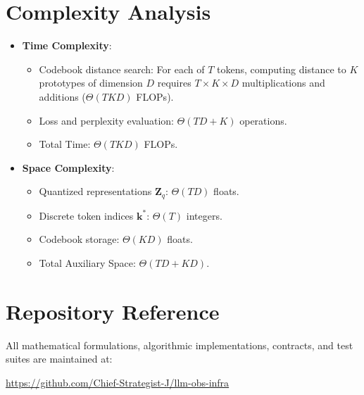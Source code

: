 \documentclass[11pt,a4paper]{article}
\theoremstyle{definition}
\begin{document}
\section{Complexity Analysis}
\begin{itemize}
    \item \textbf{Time Complexity}:
    \begin{itemize}
        \item Codebook distance search: For each of $T$ tokens, computing distance to $K$ prototypes of dimension $D$ requires $T \times K \times D$ multiplications and additions ($\Theta(T K D)$ FLOPs).
        \item Loss and perplexity evaluation: $\Theta(T D + K)$ operations.
        \item Total Time: $\Theta(T K D)$ FLOPs.
    \end{itemize}
    \item \textbf{Space Complexity}:
    \begin{itemize}
        \item Quantized representations $\mathbf{Z}_q$: $\Theta(T D)$ floats.
        \item Discrete token indices $\mathbf{k}^*$: $\Theta(T)$ integers.
        \item Codebook storage: $\Theta(K D)$ floats.
        \item Total Auxiliary Space: $\Theta(T D + K D)$.
    \end{itemize}
\end{itemize}

\section{Repository Reference}
All mathematical formulations, algorithmic implementations, contracts, and test suites are maintained at:
\begin{center}
\url{https://github.com/Chief-Strategist-J/llm-obs-infra}
\end{center}
\end{document}
